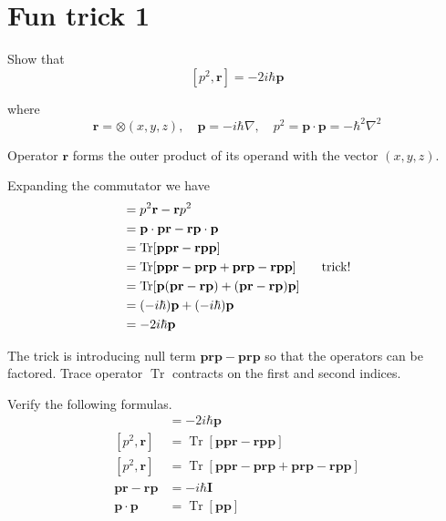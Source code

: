 

\section*{Fun trick 1}

Show that
\begin{equation*}
\left[p^2,\mathbf r\right]=-2i\hbar\mathbf p
\end{equation*}

where
\begin{equation*}
\mathbf r=\otimes(x,y,z),\quad
\mathbf p=-i\hbar\nabla,\quad
p^2=\mathbf p\cdot\mathbf p=-\hbar^2\nabla^2
\end{equation*}

Operator $\mathbf r$ forms the outer product of its operand
with the vector $(x,y,z)$.

\bigskip
Expanding the commutator we have
\begin{align*}
[p^2,\mathbf r]
&=p^2\mathbf r-\mathbf rp^2
\\
&=\mathbf p\cdot\mathbf p\mathbf r-\mathbf r \mathbf p\cdot\mathbf p
\\
&=\operatorname{Tr}[\mathbf{ppr}-\mathbf{rpp}]
\\
&=\operatorname{Tr}[\mathbf p\mathbf p\mathbf r-\mathbf p\mathbf r\mathbf p
+\mathbf p\mathbf r\mathbf p-\mathbf r\mathbf p\mathbf p]
\tag*{\text{trick!}}
\\
&=\operatorname{Tr}[\mathbf p(\mathbf{pr}-\mathbf{rp})
+(\mathbf{pr}-\mathbf{rp})\mathbf p]
\\
&=(-i\hbar)\mathbf p+(-i\hbar)\mathbf p
\\
&=-2i\hbar\mathbf p
\end{align*}

The trick is introducing null term $\mathbf{prp}-\mathbf{prp}$
so that the operators can be factored.
Trace operator $\operatorname{Tr}$ contracts on the first and second indices.

\bigskip
Verify the following formulas.
\begin{align*}
[p^2,\mathbf r]
&=-2i\hbar\mathbf p
\tag{1}
\\[1ex]
[p^2,\mathbf r]
&=\operatorname{Tr}[\mathbf{ppr}-\mathbf{rpp}]
\tag{2}
\\[1ex]
[p^2,\mathbf r]
&=\operatorname{Tr}[\mathbf p\mathbf p\mathbf r-\mathbf p\mathbf r\mathbf p
+\mathbf p\mathbf r\mathbf p-\mathbf r\mathbf p\mathbf p]
\tag{3}
\\[1ex]
\mathbf p\mathbf r-\mathbf r\mathbf p&=-i\hbar\mathbf I
\tag{4}
\\[1ex]
\mathbf p\cdot\mathbf p&=\operatorname{Tr}[\mathbf p\mathbf p]
\tag{5}
\end{align*}


